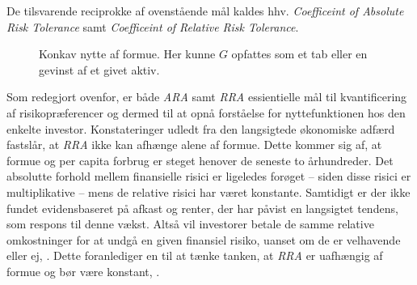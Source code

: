 \documentclass[
  a4paper,
  oneside]{memoir}
\begin{document}
De tilsvarende reciprokke af ovenstående mål kaldes hhv. \emph{Coefficeint of Absolute Risk Tolerance} samt \emph{Coefficeint of Relative Risk Tolerance}.

\begin{figure}[H]
\centering
{}
\caption[Konkav nytte af formue.]{Konkav nytte af formue. Her kunne $G$ opfattes som et tab eller en gevinst af et givet aktiv.}
\label{fig:Nyt}
\end{figure}

Som redegjort ovenfor, er både \emph{ARA} samt \emph{RRA} essientielle mål til kvantificering af risikopræferencer og dermed til at opnå forståelse for nyttefunktionen hos den enkelte investor. Konstateringer udledt fra den langsigtede økonomiske adfærd fastslår, at \emph{RRA} ikke kan afhænge alene af formue. Dette kommer sig af, at formue og per capita forbrug er steget henover de seneste to århundreder. Det absolutte forhold mellem finansielle risici er ligeledes forøget -- siden disse risici er multiplikative -- mens de relative risici har været konstante. Samtidigt er der ikke fundet evidensbaseret på afkast og renter, der har påvist en langsigtet tendens, som respons til denne vækst. Altså vil investorer betale de samme relative omkostninger for at undgå en given finansiel risiko, uanset om de er velhavende eller ej, \citep{CampVic2003}. Dette foranlediger en til at tænke tanken, at \emph{RRA} er uafhængig af formue og bør være konstant, \citep{Chiappori2008}.
\end{document}

